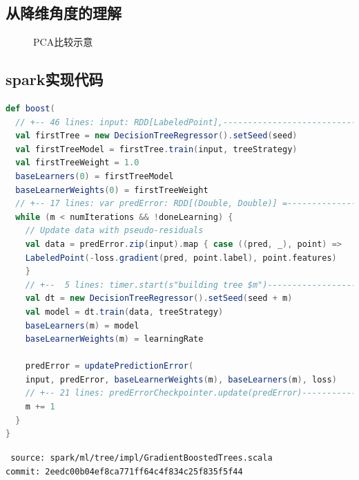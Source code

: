 \subsection{从降维角度的理解}
\begin{frame}
    \begin{figure}
        \centering
        \hfil
        \subfigure[][]{
            \resizebox{0.50\linewidth}{!}{}
        }
        \caption{PCA\footnotemark 比较示意}
    \end{figure}

\end{frame}


\subsection{spark实现代码}
\begin{frame}[fragile]
    \begin{lstlisting}[language=Scala,style=myScalastyle]
def boost(
  // +-- 46 lines: input: RDD[LabeledPoint],------------------------------
  val firstTree = new DecisionTreeRegressor().setSeed(seed)
  val firstTreeModel = firstTree.train(input, treeStrategy)
  val firstTreeWeight = 1.0
  baseLearners(0) = firstTreeModel
  baseLearnerWeights(0) = firstTreeWeight
  // +-- 17 lines: var predError: RDD[(Double, Double)] =-----------------
  while (m < numIterations && !doneLearning) {
    // Update data with pseudo-residuals
    val data = predError.zip(input).map { case ((pred, _), point) =>
    LabeledPoint(-loss.gradient(pred, point.label), point.features)
    }
    // +--  5 lines: timer.start(s"building tree $m")----------------------
    val dt = new DecisionTreeRegressor().setSeed(seed + m)
    val model = dt.train(data, treeStrategy)
    baseLearners(m) = model
    baseLearnerWeights(m) = learningRate

    predError = updatePredictionError(
    input, predError, baseLearnerWeights(m), baseLearners(m), loss)
    // +-- 21 lines: predErrorCheckpointer.update(predError)---------------
    m += 1
  }
}
    \end{lstlisting}
    {\tiny \tt
    source: spark/ml/tree/impl/GradientBoostedTrees.scala \\[-2ex]
    commit: 2eedc00b04ef8ca771ff64c4f834c25f835f5f44}
\end{frame}
